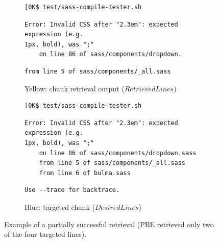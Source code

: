 \begin{figure}[tbp]
  \centering
\begin{subfigure}[b]{\columnwidth}
  \begin{lstlisting}[breaklines=true,frame=tlr]
[0K$ test/sass-compile-tester.sh
  \end{lstlisting}
  \vspace{-\baselineskip}
  \begin{lstlisting}[backgroundcolor=\color{Yellow!60},breaklines=true,frame=rl]
Error: Invalid CSS after "2.3em": expected expression (e.g.
1px, bold), was ";"
	on line 86 of sass/components/dropdown.
  \end{lstlisting}
  \vspace{-\baselineskip}
  \begin{lstlisting}[breaklines=true,frame=blr]
	from line 5 of sass/components/_all.sass
  \end{lstlisting}
	\caption{Yellow: chunk retrieval output ($RetrievedLines$)}
	\label{lst:pbe-part-success-output}
\end{subfigure}

\begin{subfigure}[b]{\columnwidth}
  \begin{lstlisting}[breaklines=true,frame=tlr]
[0K$ test/sass-compile-tester.sh
  \end{lstlisting}
  \vspace{-\baselineskip}
  \begin{lstlisting}[backgroundcolor=\color{Cerulean!60},breaklines=true,frame=rl]
Error: Invalid CSS after "2.3em": expected expression (e.g.
1px, bold), was ";"
	on line 86 of sass/components/dropdown.sass
	from line 5 of sass/components/_all.sass
	from line 6 of bulma.sass
  \end{lstlisting}
  \vspace{-\baselineskip}
  \begin{lstlisting}[breaklines=true,frame=blr]
  Use --trace for backtrace.
  \end{lstlisting}
	\caption{Blue: targeted chunk ($DesiredLines$)}
	\label{lst:pbe-part-success-desired}
\end{subfigure}
  \caption{Example of a partially successful retrieval
  (PBE retrieved only
  two of the four targeted lines).}
  \label{lst:pbe-partially-successful}
\end{figure}

